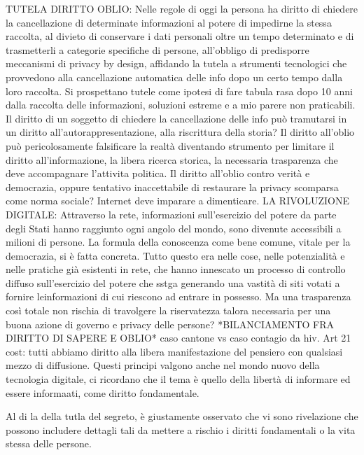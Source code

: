TUTELA DIRITTO OBLIO:
Nelle regole di oggi la persona ha diritto di chiedere la cancellazione di determinate informazioni al potere di impedirne la stessa raccolta, al divieto di conservare i dati personali oltre un tempo determinato e di trasmetterli a categorie specifiche di persone, all’obbligo di predisporre meccanismi di privacy by design, affidando la tutela a strumenti tecnologici che provvedono alla cancellazione automatica delle info dopo un certo tempo dalla loro raccolta.
Si prospettano tutele come ipotesi di fare tabula rasa dopo 10 anni dalla raccolta delle informazioni, soluzioni estreme e a mio parere non praticabili.
Il diritto di un soggetto di chiedere la cancellazione delle info può tramutarsi in un diritto all’autorappresentazione, alla riscrittura della storia? Il diritto all’oblio può pericolosamente falsificare la realtà diventando strumento per limitare il diritto all’informazione, la libera ricerca storica, la necessaria trasparenza che deve accompagnare l’attivita politica.
Il diritto all’oblio contro verità e democrazia, oppure tentativo inaccettabile di restaurare la privacy scomparsa come norma sociale? Internet deve imparare a dimenticare.
LA RIVOLUZIONE DIGITALE:
Attraverso la rete, informazioni sull’esercizio del potere da parte degli Stati hanno raggiunto ogni angolo  del mondo, sono divenute accessibili a milioni di persone. La formula della conoscenza come bene comune, vitale per la democrazia, si è fatta concreta. Tutto questo era nelle cose, nelle potenzialità e nelle pratiche già esistenti in rete, che hanno innescato un processo di controllo diffuso sull’esercizio del potere che sstga generando una vastità di siti votati a fornire leinformazioni di cui riescono ad entrare in possesso. Ma una trasparenza così totale non rischia di travolgere la riservatezza talora necessaria per una buona azione di governo e privacy delle persone?
*BILANCIAMENTO FRA DIRITTO DI SAPERE E OBLIO* caso cantone vs caso contagio da hiv.
Art 21 cost: tutti abbiamo diritto alla libera manifestazione del pensiero con qualsiasi mezzo di diffusione. Questi principi valgono anche nel mondo nuovo della tecnologia digitale, ci ricordano che il tema è quello della libertà di informare ed essere informaati, come diritto fondamentale.

Al di la della tutla del segreto, è giustamente osservato che vi sono rivelazione che  possono includere dettagli tali da mettere a rischio i diritti fondamentali o la vita stessa delle persone. 
